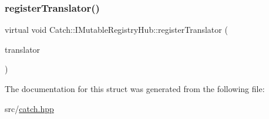 \subsubsection{\texorpdfstring{register\+Translator()}{registerTranslator()}}
{\footnotesize\ttfamily virtual void Catch\+::\+I\+Mutable\+Registry\+Hub\+::register\+Translator (\begin{DoxyParamCaption}\item[{const \hyperlink{struct_catch_1_1_i_exception_translator}{I\+Exception\+Translator} $\ast$}]{translator }\end{DoxyParamCaption})\hspace{0.3cm}{\ttfamily [pure virtual]}}



The documentation for this struct was generated from the following file\+:\begin{DoxyCompactItemize}
\item 
src/\hyperlink{catch_8hpp}{catch.\+hpp}\end{DoxyCompactItemize}
